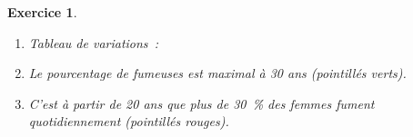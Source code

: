 \documentclass[10pt]{article}
\newtheorem{exo}{Exercice}
\begin{document}
\begin{exo}
\begin{enumerate}
\item Tableau de variations~:
\begin{center}
\end{center}
\item Le pourcentage de fumeuses est maximal à 30 ans (pointillés verts).
\item C'est à partir de 20 ans que plus de 30~\% des femmes fument quotidiennement (pointillés rouges).

\end{enumerate}

\end{exo}
\end{document}
